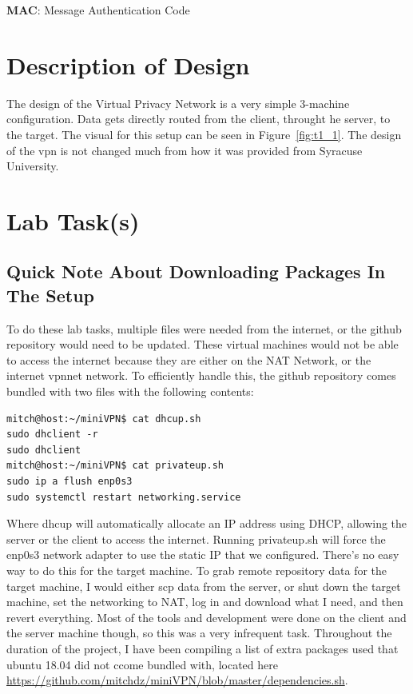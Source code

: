 \documentclass[12pt]{article}
\begin{document}
\item \textbf{MAC}: Message Authentication Code


\section{Description of Design}

The design of the Virtual Privacy Network is a very simple 3-machine configuration. Data gets directly routed from the client, throught he server, to the target. The visual for this setup can be seen in Figure~\ref{fig:t1_1}. The design of the vpn is not changed much from how it was provided from Syracuse University.

\clearpage
\section{Lab Task(s)}
\subsection{Quick Note About Downloading Packages In The Setup}
To do these lab tasks, multiple files were needed from the internet, or the github repository would need to be updated. These virtual machines would not be able to access the internet because they are either on the NAT Network, or the internet vpnnet network. To efficiently handle this, the github repository comes bundled with two files with the following contents:

\begin{verbatim}
mitch@host:~/miniVPN$ cat dhcup.sh
sudo dhclient -r
sudo dhclient
mitch@host:~/miniVPN$ cat privateup.sh
sudo ip a flush enp0s3
sudo systemctl restart networking.service
\end{verbatim}

Where dhcup will automatically allocate an IP address using DHCP, allowing the server or the client to access the internet. Running privateup.sh will force the enp0s3 network adapter to use the static IP that we configured. There's no easy way to do this for the target machine. To grab remote repository data for the target machine, I would either scp data from the server, or shut down the target machine, set the networking to NAT, log in and download what I need, and then revert everything. Most of the tools and development were done on the client and the server machine though, so this was a very infrequent task. Throughout the duration of the project, I have been compiling a list of extra packages used that ubuntu 18.04 did not ccome bundled with, located here \url{https://github.com/mitchdz/miniVPN/blob/master/dependencies.sh}.
\end{document}

